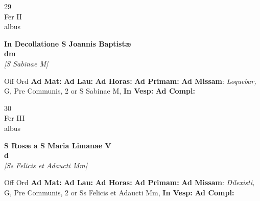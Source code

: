 \documentclass[10pt, openany]{book}
\begin{document}
    \begin{center}
        \begin{minipage}{3.5in}
            \vspace{2em}
            \begin{minipage}{0.5in}
                {\Huge 29} \\
                {\normalsize Fer II} \\
                {\normalsize albus}
            \end{minipage}
            \begin{minipage}{3.0in}
                \textbf{ \large In Decollatione S Joannis Baptistæ \\
                \textnormal{\normalsize dm}} \\ \textit{[S Sabinae M]} \\ 
            \end{minipage}
            \begin{justify}Off Ord
                \textbf{Ad Mat: }
                \textbf{Ad Lau: }
                \textbf{Ad Horas: }
                \textbf{Ad Primam: }\textbf{Ad Missam}: \textit{Loquebar,} G, Pre Communis, 2 or S Sabinae M,  
                \textbf{In Vesp: }
                \textbf{Ad Compl: }
            \end{justify}
        \end{minipage}
    \end{center}

    \begin{center}
        \begin{minipage}{3.5in}
            \vspace{2em}
            \begin{minipage}{0.5in}
                {\Huge 30} \\
                {\normalsize Fer III} \\
                {\normalsize albus}
            \end{minipage}
            \begin{minipage}{3.0in}
                \textbf{ \large S Rosæ a S Maria Limanae V \\
                \textnormal{\normalsize d}} \\ \textit{[Ss Felicis et Adaucti Mm]} \\ 
            \end{minipage}
            \begin{justify}Off Ord
                \textbf{Ad Mat: }
                \textbf{Ad Lau: }
                \textbf{Ad Horas: }
                \textbf{Ad Primam: }\textbf{Ad Missam}: \textit{Dilexisti,} G, Pre Communis, 2 or Ss Felicis et Adaucti Mm,  
                \textbf{In Vesp: }
                \textbf{Ad Compl: }
            \end{justify}
        \end{minipage}
    \end{center}
\end{document}
